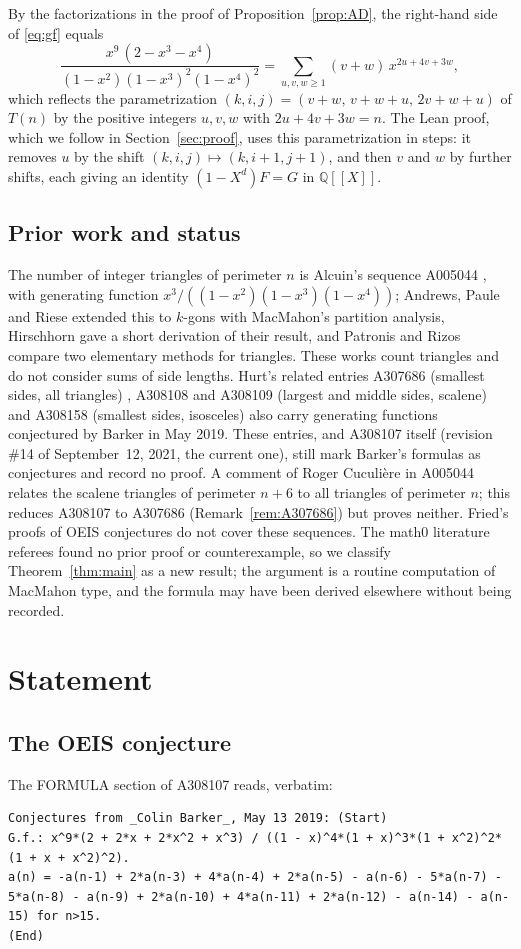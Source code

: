 \documentclass[11pt]{amsart}
\theoremstyle{plain}
\theoremstyle{definition}
\newcommand{\Q}{\mathbb{Q}}
\newcommand{\Qx}{\Q[\![X]\!]}
\begin{document}
By the factorizations in the proof of Proposition~\ref{prop:AD}, the right-hand side of \eqref{eq:gf} equals
\[
  \frac{x^9\,(2-x^3-x^4)}{(1-x^2)(1-x^3)^2(1-x^4)^2}=\sum_{u,v,w\ge1}(v+w)\,x^{2u+4v+3w},
\]
which reflects the parametrization $(k,i,j)=(v+w,\,v+w+u,\,2v+w+u)$ of $T(n)$ by the positive integers $u,v,w$ with $2u+4v+3w=n$.
The Lean proof, which we follow in Section~\ref{sec:proof}, uses this parametrization in steps: it removes $u$ by the shift $(k,i,j)\mapsto(k,i+1,j+1)$, and then $v$ and $w$ by further shifts, each giving an identity $(1-X^d)F=G$ in $\Qx$.

\subsection*{Prior work and status}
The number of integer triangles of perimeter $n$ is Alcuin's sequence A005044 \cite{A005044}, with generating function $x^3/((1-x^2)(1-x^3)(1-x^4))$; Andrews, Paule and Riese \cite{APR01} extended this to $k$-gons with MacMahon's partition analysis, Hirschhorn \cite{Hir02} gave a short derivation of their result, and Patronis and Rizos \cite{PR23} compare two elementary methods for triangles.
These works count triangles and do not consider sums of side lengths.
Hurt's related entries A307686 (smallest sides, all triangles) \cite{A307686}, A308108 and A308109 (largest and middle sides, scalene) \cite{A308108,A308109} and A308158 (smallest sides, isosceles) \cite{A308158} also carry generating functions conjectured by Barker in May 2019.
These entries, and A308107 itself (revision \#14 of September~12, 2021, the current one), still mark Barker's formulas as conjectures and record no proof.
A comment of Roger Cuculière in A005044 relates the scalene triangles of perimeter $n+6$ to all triangles of perimeter $n$; this reduces A308107 to A307686 (Remark~\ref{rem:A307686}) but proves neither.
Fried's proofs of OEIS conjectures \cite{Fri24,Fri25,Fri26,Fri26b} do not cover these sequences.
The math0 literature referees found no prior proof or counterexample, so we classify Theorem~\ref{thm:main} as a new result; the argument is a routine computation of MacMahon type, and the formula may have been derived elsewhere without being recorded.

\section{Statement}\label{sec:statement}

\subsection*{The OEIS conjecture}
The FORMULA section of A308107 reads, verbatim:
\begin{lstlisting}[language={}]
Conjectures from _Colin Barker_, May 13 2019: (Start)
G.f.: x^9*(2 + 2*x + 2*x^2 + x^3) / ((1 - x)^4*(1 + x)^3*(1 + x^2)^2*(1 + x + x^2)^2).
a(n) = -a(n-1) + 2*a(n-3) + 4*a(n-4) + 2*a(n-5) - a(n-6) - 5*a(n-7) - 5*a(n-8) - a(n-9) + 2*a(n-10) + 4*a(n-11) + 2*a(n-12) - a(n-14) - a(n-15) for n>15.
(End)
\end{lstlisting}
\end{document}
